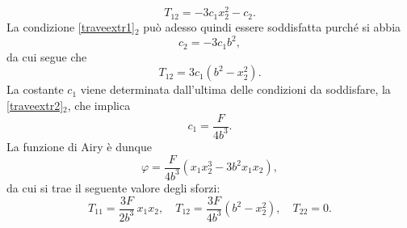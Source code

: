 \begin{exercise}
\begin{svolgimento}
\begin{equation}
	T_{12}=-3c_1x_2^2-c_2.
\end{equation}
La condizione \eqref{traveextr1}$_2$ può adesso quindi essere soddisfatta purché si abbia
\begin{equation}
	c_2=-3c_1b^2, 
\end{equation}
da cui segue che
\begin{equation}
	T_{12}=3c_1(b^2-x_2^2).
\end{equation}
La costante $c_1$ viene determinata dall'ultima delle condizioni da soddisfare, la \eqref{traveextr2}$_2$, che implica
\begin{equation}
	c_1=\frac{F}{4b^3}.
\end{equation}
La funzione di Airy è dunque
\begin{equation}
	\varphi=\frac{F}{4b^3}(x_1x_2^3-3b^2x_1x_2),
\end{equation}
da cui si trae il seguente valore degli sforzi:
\begin{equation}
	T_{11}=\frac{3F}{2b^3}\,x_1x_2, \quad T_{12}=\frac{3F}{4b^3}(b^2-x_2^2), \quad T_{22}=0.
\end{equation}
\end{svolgimento}
\end{exercise}



